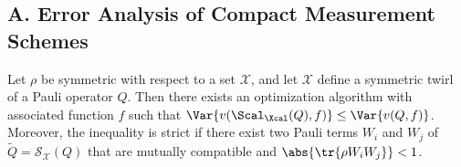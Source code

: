 \documentclass[prl,aps,notitlepage,superscriptaddress,showpacs,nofootinbib]{revtex4-2}
\newcommand{\red}[1]{{\color{red} #1}}
\begin{document}
\subsection{A. Error Analysis of Compact Measurement Schemes}




 
\begin{proposition}
Let $\rho$ be symmetric with respect to a set $\mathcal{X}$, and let $\mathcal{X}$ define a symmetric twirl of a Pauli operator $Q$. Then there exists an optimization algorithm with associated function $f$ such that  $\Var{v(\Scal_{\Xcal} (Q), f)}\leq \Var{v(Q, f)}$. Moreover, the inequality is strict if there exist two Pauli terms $W_i$ and $W_j$ of $\widetilde{Q} = \mathcal{S}_{\mathcal{X}}(Q)$ that are mutually compatible \red{and $\abs{\tr{\rho W_i W_j}} < 1$}.
\end{proposition}


\end{document}

